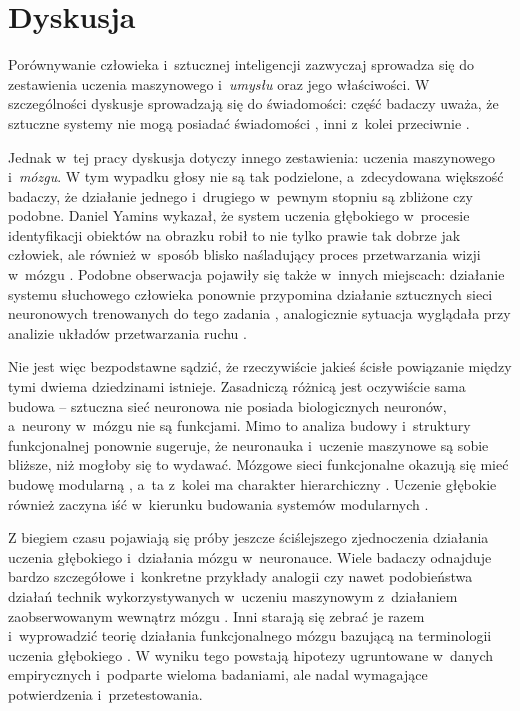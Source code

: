 \chapter{Dyskusja}

Porównywanie człowieka i~sztucznej inteligencji zazwyczaj sprowadza się do zestawienia uczenia maszynowego i~\emph{umysłu} oraz jego właściwości.
W szczególności dyskusje sprowadzają się do świadomości: część badaczy uważa, że sztuczne systemy nie mogą posiadać świadomości \cite{zlatev2000meaning}, inni z~kolei przeciwnie \cite{dietrich2001banbury, reggia2013rise, mallakin2019integration}.

Jednak w~tej pracy dyskusja dotyczy innego zestawienia: uczenia maszynowego i~\emph{mózgu}.
W tym wypadku głosy nie są tak podzielone, a~zdecydowana większość badaczy, że działanie jednego i~drugiego w~pewnym stopniu są zbliżone czy podobne.
Daniel Yamins wykazał, że system uczenia głębokiego w~procesie identyfikacji obiektów na obrazku robił to nie tylko prawie tak dobrze jak człowiek, ale również w~sposób blisko naśladujący proces przetwarzania wizji w~mózgu  \cite{yamins2014performance}.
Podobne obserwacja pojawiły się także w~innych miejscach: działanie systemu słuchowego człowieka ponownie przypomina działanie sztucznych sieci neuronowych trenowanych do tego zadania \cite{kell2018task}, analogicznie sytuacja wyglądała przy analizie układów przetwarzania ruchu \cite{lillicrap2013preference}.

Nie jest więc bezpodstawne sądzić, że rzeczywiście jakieś ścisłe powiązanie między tymi dwiema dziedzinami istnieje.
Zasadniczą różnicą jest oczywiście sama budowa -- sztuczna sieć neuronowa nie posiada biologicznych neuronów, a~neurony w~mózgu nie są funkcjami.
Mimo to analiza budowy i~struktury funkcjonalnej ponownie sugeruje, że neuronauka i~uczenie maszynowe są sobie bliższe, niż mogłoby się to wydawać.
Mózgowe sieci funkcjonalne okazują się mieć budowę modularną \cite{bullmore2009complex}, a~ta z~kolei ma charakter hierarchiczny \cite{meunier2009hierarchical}.
Uczenie głębokie również zaczyna iść w~kierunku budowania systemów modularnych \cite{schmidt1998modularity, hoverstad2011noise}.

Z biegiem czasu pojawiają się próby jeszcze ściślejszego zjednoczenia działania uczenia głębokiego i~działania mózgu w~neuronauce.
Wiele badaczy odnajduje bardzo szczegółowe i~konkretne przykłady analogii czy nawet podobieństwa działań technik wykorzystywanych w~uczeniu maszynowym z~działaniem zaobserwowanym wewnątrz mózgu \cite{galtier2013biological, o2014goal, o2014learning, rodriguez2004derivation, rolls2013mechanisms}.
Inni starają się zebrać je razem i~wyprowadzić teorię działania funkcjonalnego mózgu bazującą na terminologii uczenia głębokiego \cite{marblestone2016toward, de2018deep}.
W wyniku tego powstają hipotezy ugruntowane w~danych empirycznych i~podparte wieloma badaniami, ale nadal wymagające potwierdzenia i~przetestowania.

